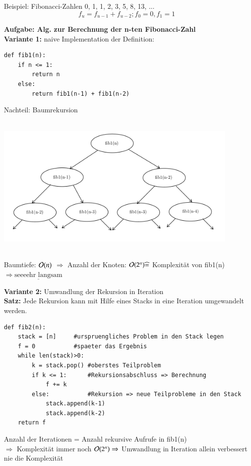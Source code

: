 Beispiel: Fibonacci-Zahlen
0, 1, 1, 2, 3, 5, 8, 13, ...\\
\[f_u = f_{u-1} + f_{u-2}; f_0 = 0, f_1 = 1\]

\textbf{Aufgabe: Alg. zur Berechnung der n-ten Fibonacci-Zahl}\\

\textbf{Variante 1:} naive Implementation der Definition:
\begin{verbatim}
def fib1(n):
    if n <= 1:
        return n
    else:
        return fib1(n-1) + fib1(n-2)
\end{verbatim}
Nachteil: Baumrekursion\\
\begin{center}
\includegraphics[width=12cm,height=7cm,keepaspectratio]{./Pictures/Fibonacci.png}
\end{center}

Baumtiefe: $\mathcal{O}{}(n)$ $\Rightarrow$ Anzahl der Knoten: $\mathcal{O}{}(2^n) \widehat{=}$ Komplexität von fib1(n) $\Rightarrow \underline{\text{seeeehr langsam}}$

\textbf{Variante 2:} Umwandlung der Rekursion in Iteration\\

\textbf{Satz:} Jede Rekursion kann mit Hilfe eines Stacks in eine Iteration umgewandelt werden.
\begin{verbatim}
def fib2(n):
    stack = [n]     #urspruengliches Problem in den Stack legen
    f = 0           #spaeter das Ergebnis
    while len(stack)>0:
        k = stack.pop() #oberstes Teilproblem
        if k <= 1:      #Rekursionsabschluss => Berechnung
            f += k
        else:           #Rekursion => neue Teilprobleme in den Stack
            stack.append(k-1)
            stack.append(k-2)
    return f
\end{verbatim}

Anzahl der Iterationen = Anzahl rekursive Aufrufe in fib1(n)\\
$\Rightarrow$ Komplexität immer noch $\mathcal{O}{}(2^n) \Rightarrow$ Umwandlung in Iteration allein verbessert nie die Komplexität\\

